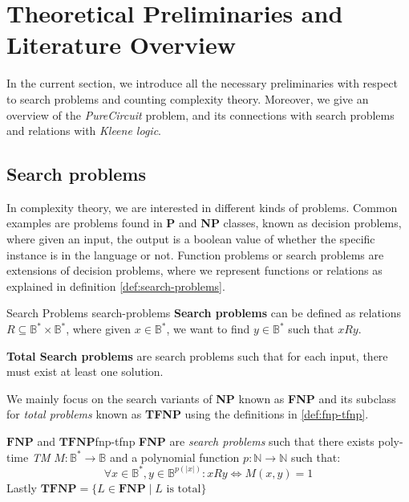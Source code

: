 \section{Theoretical Preliminaries and Literature Overview} \label{sec:theo-prelims}
In the current section, we introduce all the necessary preliminaries
with respect to search problems and counting complexity theory.
Moreover, we give an overview of the \textit{PureCircuit} problem, and its connections
with search problems and relations with \textit{Kleene logic}.


\subsection{Search problems}
In complexity theory, we are interested in different kinds of problems.
Common examples are problems found in \textbf{P} and \textbf{NP} classes,
known as decision problems, where given an input, the output is a boolean
value of whether the specific instance is in the language or not.
Function problems or search problems are extensions of decision problems,
where we  represent functions or relations as explained
in definition \ref{def:search-problems}.


\begin{definitionbox}{Search Problems \cite{arora_ComputationalComplexityModern_2009}}{search-problems}
    \textbf{Search problems} can be defined as relations $R \subseteq \mathbb{B}^* \times \mathbb{B}^*$,
    where given $x \in \mathbb{B}^*$, we want to find $y \in \mathbb{B}^*$  such that $xRy$.

    \textbf{Total Search problems} are search problems such that for each input, there must exist at least one solution.
\end{definitionbox}

We mainly focus on the search variants of \textbf{NP}
known as \textbf{FNP} and its subclass for
\textit{total problems} known as \textbf{TFNP}
using the definitions in \ref{def:fnp-tfnp}.

\begin{definitionbox}{$\textbf{FNP}$ and $\textbf{TFNP}$}{fnp-tfnp}
    \textbf{FNP} are \textit{search problems} such that there exists poly-time \textit{TM} $M: \mathbb{B}^* \to \mathbb{B}$
    and a polynomial function $p : \mathbb{N} \to \mathbb{N}$ such that:
    $$
        \forall x \in \mathbb{B}^*, y \in \mathbb{B}^{p(|x|)}: xRy \iff M(x,y) = 1
    $$
    Lastly $\textbf{TFNP} = \{L \in \textbf{FNP} \mid L \text{ is total}\}$
\end{definitionbox}

